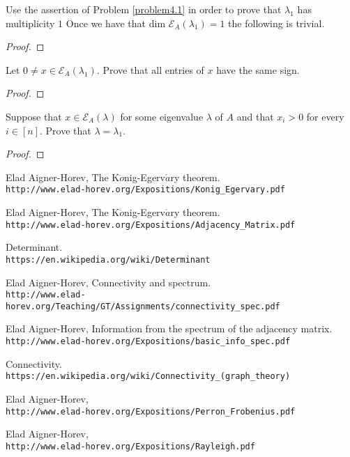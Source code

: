 \documentclass[a4paper, 11pt, oneside]{article}
\newenvironment{problem}[1]
  {\renewcommand\theinnercustomprob{#1}\innercustomprob}
  {\endinnercustomprob}
\begin{document}
\begin{problem}{4.2}\label{problem4.2}
Use the assertion of Problem \ref{problem4.1} in order to prove that $\lambda_1$ has multiplicity $1$
Once we have that dim $\mathcal{E}_A(\lambda_1) = 1$ the following is trivial.
\end{problem}

\begin{proof}

\end{proof}

\begin{problem}{4.3}\label{problem4.3}
Let $0 \neq x \in \mathcal{E}_A(\lambda_1)$. Prove that all entries of $x$ have the same sign.
\end{problem}

\begin{proof}

\end{proof}

\begin{problem}{4.4}\label{problem4.4}
Suppose that $x \in \mathcal{E}_A(\lambda)$ for some eigenvalue $\lambda$ of $A$ and that $x_i > 0$ for every $i \in [n]$.
Prove that $\lambda = \lambda_1$.
\end{problem}

\begin{proof}

\end{proof}

\begin{thebibliography}{9} 
Elad Aigner-Horev,
The K$\ddot{o}$nig-Egerv$\acute{a}$ry theorem.
\\\texttt{http://www.elad-horev.org/Expositions/Konig\_Egervary.pdf}

Elad Aigner-Horev,
The K$\ddot{o}$nig-Egerv$\acute{a}$ry theorem.
\\\texttt{http://www.elad-horev.org/Expositions/Adjacency\_Matrix.pdf}

Determinant.
\\\texttt{https://en.wikipedia.org/wiki/Determinant}

Elad Aigner-Horev,
Connectivity and spectrum.
\\\texttt{http://www.elad-horev.org/Teaching/GT/Assignments/connectivity\_spec.pdf}

Elad Aigner-Horev,
Information from the spectrum of the adjacency matrix.
\\\texttt{http://www.elad-horev.org/Expositions/basic\_info\_spec.pdf}

Connectivity.
\\\texttt{https://en.wikipedia.org/wiki/Connectivity\_(graph\_theory)}

Elad Aigner-Horev,
\\\texttt{http://www.elad-horev.org/Expositions/Perron\_Frobenius.pdf}

Elad Aigner-Horev,
\\\texttt{http://www.elad-horev.org/Expositions/Rayleigh.pdf}

\end{thebibliography}
\end{document}
